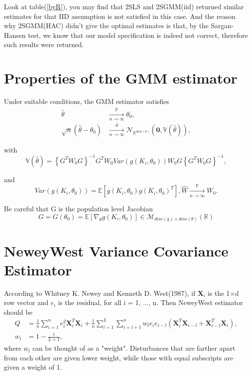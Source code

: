 \documentclass{article}
\theoremstyle{definition}
\newcommand{\limitP}{\mathop{\longrightarrow}\limits_{n \rightarrow \infty}^{\mathbb{P}}}
\newcommand{\limitd}{\mathop{\longrightarrow}\limits_{n \rightarrow \infty}^{d}}
\begin{document}
Look at table(\ref{byR}), you may find that 2SLS and 2SGMM(iid) returned similar estimates for that IID assumption is not satisfied in this case. And the reason why 2SGMM(HAC) didn't give the optimal estimates is that, by the Sargan-Hansen test, we know that our model specification is indeed not correct, therefore such results were returned. 





\newpage
\begin{appendices}

\section{Properties of the GMM estimator}\label{property}
Under suitable conditions, the GMM estimator satisfies
\begin{align*}
	\hat{\theta} &  \limitP \theta_0,\\
	\sqrt{n}(\hat{\theta} - \theta_0) & \limitd \mathcal{N}_{\mathbb{R}^{dim(\theta)}}(\textbf{0}, \mathbb{V}(\hat{\theta})),
\end{align*}

with
\begin{equation*}
	\mathbb{V}(\hat{\theta}) = \left\{G^T W_0 G \right\}^{-1} G^T W_0 Var\left( g(K_i, \theta_0)\right) W_0 G\left\{G^T W_0 G \right\}^{-1},
\end{equation*}

and
\begin{equation*}
	 Var\left( g(K_i, \theta_0)\right) = \mathbb{E}\left[g(K_i, \theta_0)g(K_i, \theta_0)^T \right], \widehat{W} \limitP W_0.
\end{equation*}

Be careful that G is the population level Jacobian
\begin{equation*}
	G = G(\theta_0) = \mathbb{E}\left[\nabla_\theta g(K_i, \theta_0) \right] \in \mathcal{M}_{dim(g)\times dim(\theta)}(\mathbb{R})
\end{equation*}

\section{NeweyWest Variance Covariance Estimator}\label{HAC}
According to Whitney K. Newey and Kenneth D. West(1987), if $\textbf{X}_i$ is the 1$\times$d row vector and $e_i$ is the residual, for all i = 1, $\dots$, n. Then NeweyWest estimator should be
\begin{align*}
	Q & = \frac{1}{n}\sum_{i=1}^{n}e_i^2 \textbf{X}_i^T \textbf{X}_i + \frac{1}{n}\sum_{l=1}^{L}\sum_{i = l+1}^{n}w_l e_i e_{i-l} \left(\textbf{X}_i^T \textbf{X}_{i-l} + \textbf{X}_{i-l}^T \textbf{X}_i \right),\\
	w_l & = 1 - \frac{l}{L + 1},
\end{align*}
where $w_l$ can be thought of as a "weight". Disturbances that are farther apart from each other are given lower weight, while those with equal subscripts are given a weight of 1.
\end{appendices}
\end{document}
